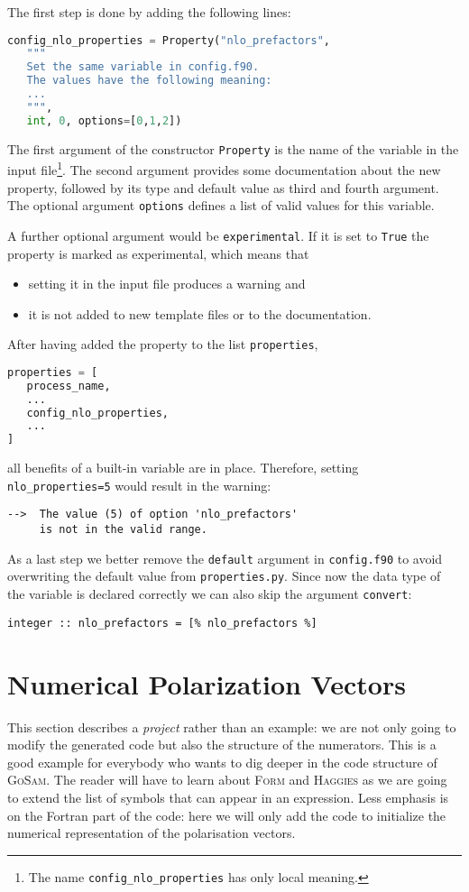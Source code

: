 \documentclass[11pt,a4paper]{refrep}
\newcommand{\golem}{\textsc{GoSam}\xspace}
\newcommand{\form}{\textsc{Form}\xspace}
\newcommand{\haggies}{\textsc{Haggies}\xspace}
\begin{document}
The first step is done by adding the following lines:
\begin{lstlisting}[language=Python]
config_nlo_properties = Property("nlo_prefactors",
   """
   Set the same variable in config.f90.
   The values have the following meaning:
   ...
   """,
   int, 0, options=[0,1,2])
\end{lstlisting}
The first argument of the constructor \texttt{Property}
is the name of the variable in the input file\footnote{%
The name \texttt{config\_nlo\_properties} has only local meaning.}.
The second argument provides some documentation about the new
property, followed by its type and default value as third and fourth
argument. The optional argument \texttt{options} defines a list of
valid values for this variable.

A further optional argument would be \texttt{experimental}.
If it is set to \texttt{True} the property is marked as experimental,
which means that
\begin{itemize}
\item setting it in the input file produces a warning and
\item it is not added to new template files or to the documentation.
\end{itemize}

After having added the property to the list \texttt{properties},
\begin{lstlisting}[language=Python]
properties = [
   process_name,
   ...
   config_nlo_properties,
   ...
]
\end{lstlisting}
all benefits of a built-in variable are in place. Therefore,
setting \texttt{nlo\_properties=5} would result in the warning:
\begin{verbatim}
-->  The value (5) of option 'nlo_prefactors'
     is not in the valid range.
\end{verbatim}

As a last step we better remove the \texttt{default} argument in
\texttt{config.f90} to avoid overwriting the default value from
\texttt{properties.py}. Since now the data type of the variable
is declared correctly we can also skip the argument \texttt{convert}:
\begin{lstlisting}
integer :: nlo_prefactors = [% nlo_prefactors %]
\end{lstlisting}

\section{Numerical Polarization Vectors}
This section describes a \emph{project} rather than an example:
we are not only going to modify the generated code but also the
structure of the numerators. This is a good example for everybody who
wants to dig deeper in the code structure of \golem{}.
The reader will have to learn about \form{} and \haggies{} as we are going
to extend the list of symbols that can appear in an expression.
Less emphasis is on the Fortran part of the code: here we will only add
the code to initialize the numerical representation of the polarisation
vectors.
\end{document}
